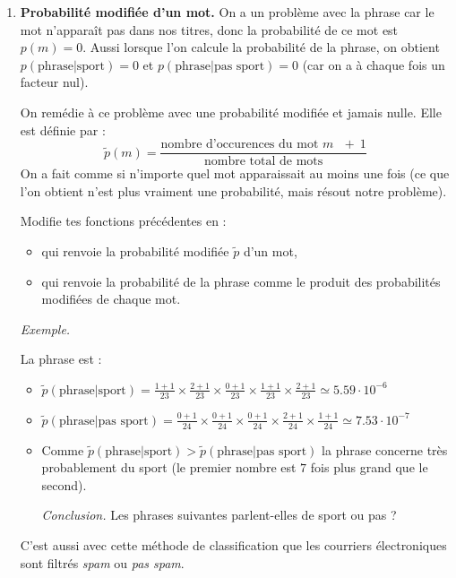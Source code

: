 \documentclass[11pt,class=report,crop=false]{standalone}
\begin{document}
\begin{activite}
\begin{enumerate}
		
	\item \textbf{Probabilité modifiée d'un mot.}
	On a un problème avec la phrase  car le mot  n'apparaît pas dans nos titres, donc la probabilité de ce mot est $p(m) = 0$.
	Aussi lorsque l'on calcule la probabilité de la phrase, on obtient
	$p(\text{phrase}|\text{sport}) = 0$ et $p(\text{phrase}|\text{pas sport})=0$ (car on a à chaque fois un facteur nul).
	
	On remédie à ce problème avec une probabilité modifiée et jamais nulle. Elle est définie par :
	$$\tilde p(m) = \frac{\text{nombre d'occurences du mot } m \ \ \ + \ 1}{\text{nombre total de mots}}$$
	On a fait comme si n'importe quel mot apparaissait au moins une fois (ce que l'on obtient n'est plus vraiment une probabilité, mais résout notre problème).
	
	Modifie tes fonctions précédentes en :
	\begin{itemize}
		\item  {} qui renvoie la probabilité modifiée $\tilde p$ d'un mot,
		\item  {} qui renvoie la probabilité de la phrase comme le produit des probabilités modifiées de chaque mot.
	\end{itemize}
	
	\medskip
	
 	\emph{Exemple.}

La phrase est  :
\begin{itemize} 
	\item $\tilde p(\text{phrase}|\text{sport}) = 
\frac{1+1}{23} \times \frac{2+1}{23} \times \frac{0+1}{23} \times \frac{1+1}{23} \times \frac{2+1}{23} \simeq 5.59 \cdot 10^{-6}$

	\item $\tilde p(\text{phrase}|\text{pas sport}) = \frac{0+1}{24} \times \frac{0+1}{24} \times \frac{0+1}{24} \times \frac{2+1}{24}  \times \frac{1+1}{24} \simeq 7.53\cdot 10^{-7}$
	\item Comme $\tilde p(\text{phrase}|\text{sport}) > \tilde p(\text{phrase}|\text{pas sport})$ la phrase concerne très probablement du sport (le premier nombre est $7$ fois plus grand que le second).
	\medskip

\emph{Conclusion.}
Les phrases suivantes parlent-elles de sport ou pas ?

		
\end{itemize}	 

\bigskip

C'est aussi avec cette méthode de classification que les courriers électroniques sont filtrés \emph{spam} ou \emph{pas spam}.	
	
\end{enumerate}
\end{activite}
\end{document}
